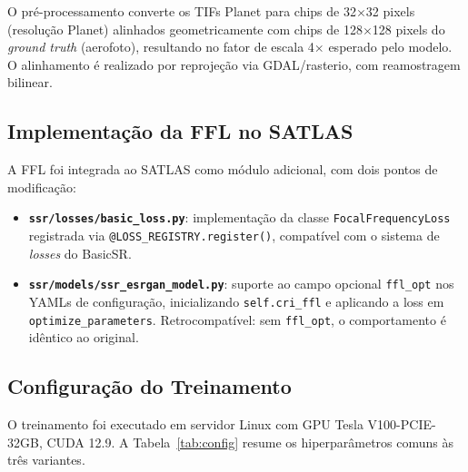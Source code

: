 \documentclass[12pt, a4paper]{article}
\begin{document}
O pré-processamento converte os TIFs Planet para chips de 32$\times$32 pixels
(resolução Planet) alinhados geometricamente com chips de 128$\times$128 pixels
do \textit{ground truth} (aerofoto), resultando no fator de escala 4$\times$
esperado pelo modelo. O alinhamento é realizado por reprojeção via GDAL/rasterio,
com reamostragem bilinear.

\subsection{Implementação da FFL no SATLAS}

A FFL foi integrada ao SATLAS como módulo adicional, com dois pontos de modificação:

\begin{itemize}
    \item \textbf{\texttt{ssr/losses/basic\_loss.py}}: implementação da classe
    \texttt{FocalFrequencyLoss} registrada via \texttt{@LOSS\_REGISTRY.register()},
    compatível com o sistema de \textit{losses} do BasicSR.

    \item \textbf{\texttt{ssr/models/ssr\_esrgan\_model.py}}: suporte ao campo
    opcional \texttt{ffl\_opt} nos YAMLs de configuração, inicializando
    \texttt{self.cri\_ffl} e aplicando a loss em \texttt{optimize\_parameters}.
    Retrocompatível: sem \texttt{ffl\_opt}, o comportamento é idêntico ao original.
\end{itemize}

\subsection{Configuração do Treinamento}

O treinamento foi executado em servidor Linux com GPU Tesla V100-PCIE-32GB,
CUDA 12.9. A Tabela~\ref{tab:config} resume os hiperparâmetros comuns às três
variantes.
\end{document}
